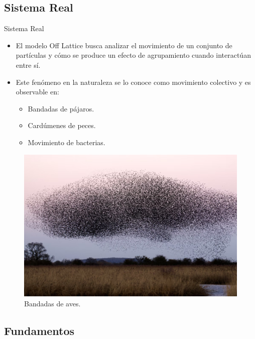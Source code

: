 \documentclass{beamer}
\begin{document}
    \subsection{Sistema Real}

    \begin{frame}{Sistema Real}
        \begin{itemize}
            \item
            El modelo Off Lattice busca analizar el movimiento de un conjunto de partículas y cómo se produce un efecto
            de agrupamiento cuando interactúan entre sí.
            \item
            Este fenómeno en la naturaleza se lo conoce como movimiento colectivo y es observable en:
                \begin{itemize}
                    \item Bandadas de pájaros.
                    \item Cardúmenes de peces.
                    \item Movimiento de bacterias.
                \end{itemize}
        \end{itemize}
        \begin{figure}[H]
            \centering
            \includegraphics[height=0.25\textheight]{./bandadas_de_aves}
            \caption{Bandadas de aves.}
            \label{fig:bandadas_de_aves}
        \end{figure}
    \end{frame}

    \subsection{Fundamentos}
\end{document}
